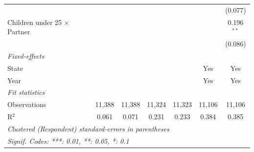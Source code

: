 \begin{tabular}{lcccccc}
                                       &                &                &                &                &                & (0.077)\\   
   Children under 25 $\times$ Partner  &                &                &                &                &                & 0.196$^{**}$\\   
                                       &                &                &                &                &                & (0.086)\\   
   \midrule
   \emph{Fixed-effects}\\
   State                               &                &                &                &                & Yes            & Yes\\  
   Year                                &                &                &                &                & Yes            & Yes\\  
   \midrule
   \emph{Fit statistics}\\
   Observations                        & 11,388         & 11,388         & 11,324         & 11,323         & 11,106         & 11,106\\  
   R$^2$                               & 0.061          & 0.071          & 0.231          & 0.233          & 0.384          & 0.385\\  
   \midrule \midrule
   \multicolumn{7}{l}{\emph{Clustered (Respondent) standard-errors in parentheses}}\\
   \multicolumn{7}{l}{\emph{Signif. Codes: ***: 0.01, **: 0.05, *: 0.1}}\\
\end{tabular}
\par\endgroup


